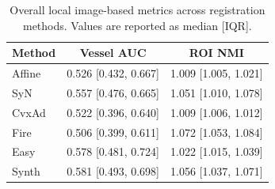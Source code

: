 \begin{table}[t]
\centering
\caption{Overall local image-based metrics across registration methods. Values are reported as median [IQR].}
\label{tab:overall_intensity}
\begin{tabular}{lcc}
\toprule
\textbf{Method} & \textbf{Vessel AUC} & \textbf{ROI NMI} \\
\midrule
Affine & 0.526 [0.432, 0.667] & 1.009 [1.005, 1.021] \\
SyN    & 0.557 [0.476, 0.665] & 1.051 [1.010, 1.078] \\
CvxAd  & 0.522 [0.396, 0.640] & 1.009 [1.006, 1.012] \\
Fire   & 0.506 [0.399, 0.611] & 1.072 [1.053, 1.084] \\
Easy   & 0.578 [0.481, 0.724] & 1.022 [1.015, 1.039] \\
Synth  & 0.581 [0.493, 0.698] & 1.056 [1.037, 1.071] \\
\bottomrule
\end{tabular}
\end{table}